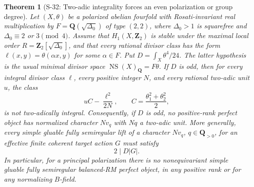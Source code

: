 \documentclass[11pt,a4paper]{article}
\newtheorem{theorem}{Theorem}[section]
\theoremstyle{definition}
\begin{document}
\begin{theorem}[S-32: Two-adic integrality forces an even polarization or group degree]
\label{thm:semireg-rm-two-adic-obstruction}
Let $(X,\theta)$ be a polarized abelian
fourfold with Rosati-invariant real multiplication by
$F=\mathbf Q(\sqrt{\Delta_0})$ of type $(2,2)$, where
$\Delta_0>1$ is squarefree and
$\Delta_0\equiv2$ or $3\pmod4$.
Assume that $H_1(X,\mathbf Z_2)$ is stable under the
maximal local order
$R=\mathbf Z_2[\sqrt{\Delta_0}]$, and that every rational
divisor class has the form
$\ell(x,y)=\theta(\alpha x,y)$ for some $\alpha\in F$.
Put $D=\int_X\theta^4/24$.
The latter hypothesis is the usual minimal divisor space
$\operatorname{NS}(X)_{\mathbf Q}=F\theta$.
If $D$ is odd, then for every integral divisor class
$\ell$, every positive integer $N$, and every rational
two-adic unit $u$, the class
\[
 uC-\frac{\ell^2}{2N},\qquad
 C=\frac{\theta_1^2+\theta_2^2}{2},
 \tag{S32.1}
\]
is not two-adically integral. Consequently, if $D$ is odd,
no positive-rank perfect object has normalized character
$Nv_q$ with $Nq$ a two-adic unit.
More generally, every simple gluable fully semiregular
lift of a character $Nv_q$, $q\in\mathbf Q_{>0}$, for an effective finite coherent
target action $G$ must satisfy
\[
 2\mid D|G|.
 \tag{S32.1a}
\]
In particular, for a principal polarization there is no
nonequivariant simple gluable fully semiregular balanced-RM
perfect object, in any positive rank or for any
normalizing $B$-field.
\end{theorem}
\end{document}
